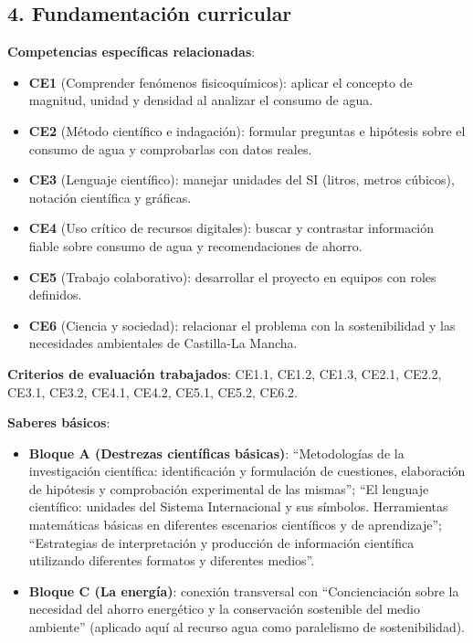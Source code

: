 \documentclass[11pt,a4paper]{article}
\begin{document}
\subsection*{4. Fundamentación curricular}
\textbf{Competencias específicas relacionadas}:
\begin{itemize}
    \item \textbf{CE1} (Comprender fenómenos fisicoquímicos): aplicar el concepto de magnitud, unidad y densidad al analizar el consumo de agua.
    \item \textbf{CE2} (Método científico e indagación): formular preguntas e hipótesis sobre el consumo de agua y comprobarlas con datos reales.
    \item \textbf{CE3} (Lenguaje científico): manejar unidades del SI (litros, metros cúbicos), notación científica y gráficas.
    \item \textbf{CE4} (Uso crítico de recursos digitales): buscar y contrastar información fiable sobre consumo de agua y recomendaciones de ahorro.
    \item \textbf{CE5} (Trabajo colaborativo): desarrollar el proyecto en equipos con roles definidos.
    \item \textbf{CE6} (Ciencia y sociedad): relacionar el problema con la sostenibilidad y las necesidades ambientales de Castilla-La Mancha.
\end{itemize}

\textbf{Criterios de evaluación trabajados}: CE1.1, CE1.2, CE1.3, CE2.1, CE2.2, CE3.1, CE3.2, CE4.1, CE4.2, CE5.1, CE5.2, CE6.2.

\textbf{Saberes básicos}:
\begin{itemize}
    \item \textbf{Bloque A (Destrezas científicas básicas)}: ``Metodologías de la investigación científica: identificación y formulación de cuestiones, elaboración de hipótesis y comprobación experimental de las mismas''; ``El lenguaje científico: unidades del Sistema Internacional y sus símbolos. Herramientas matemáticas básicas en diferentes escenarios científicos y de aprendizaje''; ``Estrategias de interpretación y producción de información científica utilizando diferentes formatos y diferentes medios''.
    \item \textbf{Bloque C (La energía)}: conexión transversal con ``Concienciación sobre la necesidad del ahorro energético y la conservación sostenible del medio ambiente'' (aplicado aquí al recurso agua como paralelismo de sostenibilidad).
\end{itemize}
\end{document}
